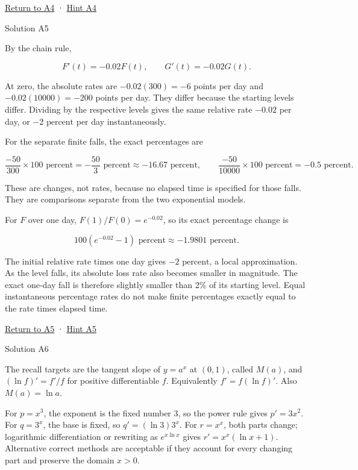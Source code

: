 \documentclass[
  11pt,
]{article}
\providecommand{\gt}{>}
\begin{document}
\protect\hyperlink{task-a4}{Return to A4} ·
\protect\hyperlink{hint-a4}{Hint A4}

Solution A5

By the chain rule,

\[
F'(t)=-0.02F(t),\qquad G'(t)=-0.02G(t).
\]

At zero, the absolute rates are \(-0.02(300)=-6\) points per day and
\(-0.02(10000)=-200\) points per day. They differ because the starting
levels differ. Dividing by the respective levels gives the same relative
rate \(-0.02\) per day, or \(-2\text{ percent}\) per day
instantaneously.

For the separate finite falls, the exact percentages are

\[
\frac{-50}{300}\times100\text{ percent}=-\frac{50}{3}\text{ percent}\approx-16.67\text{ percent},\qquad
\frac{-50}{10000}\times100\text{ percent}=-0.5\text{ percent}.
\]

These are changes, not rates, because no elapsed time is specified for
those falls. They are comparisons separate from the two exponential
models.

For \(F\) over one day, \(F(1)/F(0)=e^{-0.02}\), so its exact percentage
change is

\[
100(e^{-0.02}-1)\text{ percent}\approx-1.9801\text{ percent}.
\]

The initial relative rate times one day gives \(-2\text{ percent}\), a
local approximation. As the level falls, its absolute loss rate also
becomes smaller in magnitude. The exact one-day fall is therefore
slightly smaller than 2\% of its starting level. Equal instantaneous
percentage rates do not make finite percentages exactly equal to the
rate times elapsed time.

\protect\hyperlink{task-a5}{Return to A5} ·
\protect\hyperlink{hint-a5}{Hint A5}

Solution A6

The recall targets are the tangent slope of \(y=a^x\) at \((0,1)\),
called \(M(a)\), and \((\ln f)'=f'/f\) for positive differentiable
\(f\). Equivalently \(f'=f(\ln f)'\). Also \(M(a)=\ln a\).

For \(p=x^3\), the exponent is the fixed number 3, so the power rule
gives \(p'=3x^2\). For \(q=3^x\), the base is fixed, so
\(q'=(\ln3)3^x\). For \(r=x^x\), both parts change; logarithmic
differentiation or rewriting as \(e^{x\ln x}\) gives
\(r'=x^x(\ln x+1)\). Alternative correct methods are acceptable if they
account for every changing part and preserve the domain \(x\gt 0\).
\end{document}
